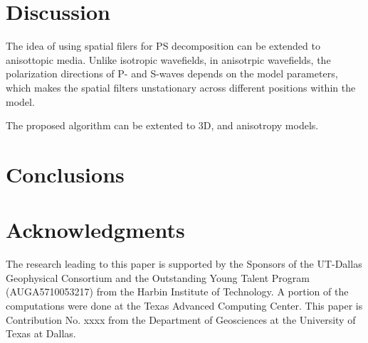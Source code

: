 \documentclass[manuscript,ulem,graphix,revised]{geophysics}
\begin{document}
\section{Discussion}
\indent\indent
The idea of using spatial filers for PS decomposition can be extended to anisottopic media. Unlike isotropic wavefields, in anisotrpic wavefields, the polarization directions of P- and S-waves depends on the model parameters, which makes the spatial filters unstationary across different positions within the model. 

The proposed algorithm can be extented to 3D, and anisotropy models.



\section{Conclusions}



\section{Acknowledgments}

The research leading to this paper is supported by the Sponsors of the
UT-Dallas Geophysical Consortium and the Outstanding Young Talent Program (AUGA5710053217) from the Harbin Institute of Technology. A portion of the computations were done at the Texas Advanced Computing Center. This paper is Contribution No. xxxx
from the Department of Geosciences at the University of Texas at Dallas.



\newpage


\end{document}
